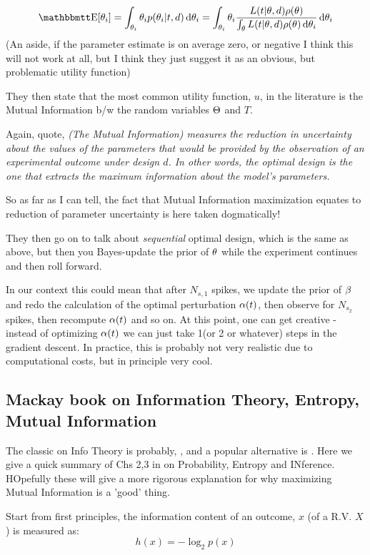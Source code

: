 \documentclass{article}
\begin{document}
$$
\Exp[\th_i] = \int_{\th_i} \th_i p(\th_i| t, d) \intd{\th_i} = 
\int_{\th_i} \th_i \frac{ L(t| \th, d) \rho (\th) }
					    {\int_\th L(t| \th, d) \rho (\th)\intd{\th_i} } \intd{\th_i} 
$$
(An aside, if the parameter estimate is on average zero, or negative I think
this will not work at all, but I think they just suggest it as an obvious, but
problematic utility function)

They then state that the most common utility function, $u$, in the
literature is the Mutual Information b/w the random variables ${\Theta}$ and $T$. 

Again, quote, {\sl (The Mutual Information)  measures the reduction in
uncertainty about the values of the parameters that would be provided by the
observation of an experimental outcome under design $d$. In other words, the
optimal design is the one that extracts the maximum information about the
model's parameters.}

So as far as I can tell, the fact that Mutual Information maximization equates
to reduction of parameter uncertainty is here taken dogmatically!

They then go on to talk about { \sl sequential } optimal design, which is the
same as above, but then you Bayes-update the prior of ${\theta}$ while the experiment
continues and then roll forward. 

In our context this could mean that after $N_{s,1}$ spikes, we update the prior
of ${\beta}$ and redo the calculation of the optimal perturbation ${\alpha}(t)$, then
observe for $N_{s_2}$ spikes, then recompute ${\alpha}(t)$ and so on. At this point,
one can get creative - instead of optimizing ${\alpha}(t)$ we can just take 1(or 2 or
whatever) steps in the gradient descent. In practice, this is probably
not very realistic due to computational costs, but in principle very cool.

\subsection{Mackay book on Information Theory, Entropy, Mutual
Information}

The classic on Info Theory is probably, \cite{Cover2006}, and a popular
alternative is \cite{MacKay2003}. Here we give a quick summary of Chs 2,3 in
\cite{MacKay2003} on Probability, Entropy and INference. HOpefully these will
give a more rigorous explanation for why maximizing Mutual Information is a
'good' thing. 

Start from first principles, the information content of an outcome, $x$ (of a
  R.V. $X$) is measured as:
  $$ h(x) = -\log_2 p(x)$$
\end{document}
